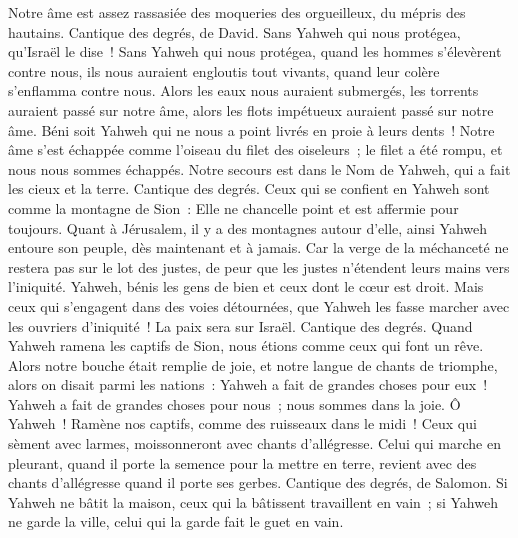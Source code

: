 \begin{multicols}{2}
Notre âme est assez rassasiée des moqueries des orgueilleux, du mépris des hautains.
\VerseOne{}Cantique des degrés, de David. Sans Yahweh qui nous protégea, qu'Israël le dise~!
Sans Yahweh qui nous protégea, quand les hommes s'élevèrent contre nous,
ils nous auraient engloutis tout vivants, quand leur colère s'enflamma contre nous.
Alors les eaux nous auraient submergés, les torrents auraient passé sur notre âme,
alors les flots impétueux auraient passé sur notre âme.
Béni soit Yahweh qui ne nous a point livrés en proie à leurs dents~!
Notre âme s'est échappée comme l'oiseau du filet des oiseleurs~; le filet a été rompu, et nous nous sommes échappés.
Notre secours est dans le Nom de Yahweh, qui a fait les cieux et la terre.
\VerseOne{}Cantique des degrés. Ceux qui se confient en Yahweh sont comme la montagne de Sion~: Elle ne chancelle point et est affermie pour toujours.
Quant à Jérusalem, il y a des montagnes autour d'elle, ainsi Yahweh entoure son peuple, dès maintenant et à jamais.
Car la verge de la méchanceté ne restera pas sur le lot des justes, de peur que les justes n'étendent leurs mains vers l'iniquité.
Yahweh, bénis les gens de bien et ceux dont le cœur est droit.
Mais ceux qui s'engagent dans des voies détournées, que Yahweh les fasse marcher avec les ouvriers d'iniquité~! La paix sera sur Israël.
\VerseOne{}Cantique des degrés. Quand Yahweh ramena les captifs de Sion, nous étions comme ceux qui font un rêve.
Alors notre bouche était remplie de joie, et notre langue de chants de triomphe, alors on disait parmi les nations~: Yahweh a fait de grandes choses pour eux~!
Yahweh a fait de grandes choses pour nous~; nous sommes dans la joie.
Ô Yahweh~! Ramène nos captifs, comme des ruisseaux dans le midi~!
Ceux qui sèment avec larmes, moissonneront avec chants d'allégresse.
Celui qui marche en pleurant, quand il porte la semence pour la mettre en terre, revient avec des chants d'allégresse quand il porte ses gerbes.
\VerseOne{}Cantique des degrés, de Salomon. Si Yahweh ne bâtit la maison, ceux qui la bâtissent travaillent en vain~; si Yahweh ne garde la ville, celui qui la garde fait le guet en vain.

\end{multicols}
